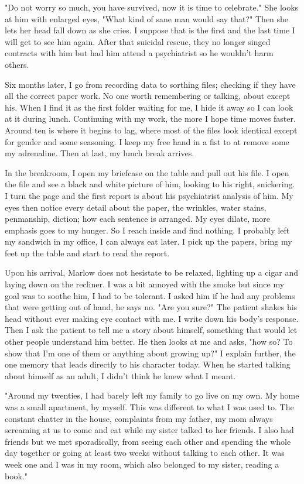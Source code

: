 		"Do not worry so much, you have survived, now it is time to celebrate." She looks at him with enlarged eyes, "What kind of sane man would say that?"
	Then she lets her head fall down as she cries. I suppose that is the first and the last time I will get to see him again. After that suicidal rescue, they
	no longer singed contracts with him but had him attend a psychiatrist so he wouldn't harm others.

		Six months later, I go from recording data to sorthing files; checking if they have all the correct paper work. No one worth remembering or talking,
about	except his. When I find it as the first folder waiting for me, I hide it away so I can look at it during lunch. Continuing with my work, the more I hope time
	moves faster. Around ten is where it begins to lag, where most of the files look identical except for gender and some seasoning. I keep my free hand in a fist
	to at remove some my adrenaline. Then at last, my lunch break arrives.

		In the breakroom, I open my briefcase on the table and pull out his file. I open the file and see a black and white picture of him, looking to his
	right, snickering. I turn the page and the first report is about his psychiatrist analysis of him. My eyes then notice every detail about the paper, the
	wrinkles, water stains, penmanship, diction; how each sentence is arranged. My eyes dilate, more emphasis goes to my hunger. So I reach inside and find nothing.
	I probably left my sandwich in my office, I can always eat later. I pick up the papers, bring my feet up the table and start to read the report.

		Upon his arrival, Marlow does not hesistate to be relaxed, lighting up a cigar and laying down on the recliner. I was a bit annoyed with the
	smoke but since my goal was to soothe him, I had to be tolerant. I asked him if he had any problems that were getting out of hand, he says no. "Are you sure?"
	The patient shakes his head without ever making eye contact with me. I write down his body's response. Then I ask the patient to tell me a story about himself,
	something that would let other people understand him better. He then looks at me and asks, "how so? To show that I'm one of them or anything about growing up?"
	I explain further, the one memory that leads directly to his character today. When he started talking about himself as an adult, I didn't think he knew what
	I meant.

		"Around my twenties, I had barely left my family to go live on my own. My home was a small apartment, by myself. This was different to what I was used
	to. The constant chatter in the house, complaints from my father, my mom always screaming at us to come and eat while my sister talked to her friends. I
	also had friends but we met sporadically, from seeing each other and spending the whole day together or going at least two weeks without talking to each other.
	It was week one and I was in my room, which also belonged to my sister, reading a book."

